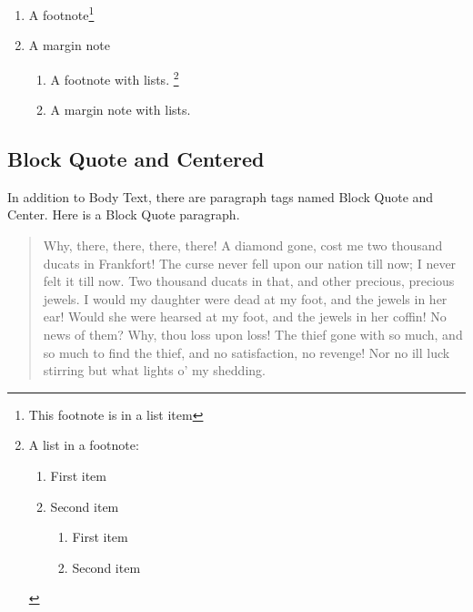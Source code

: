 \documentclass{article}
\begin{document}
\begin{enumerate}
\item A footnote\footnote{%
This footnote is in a list item}

\item A margin note%

\begin{enumerate}
\item A footnote with lists. \footnote{%
A list in a footnote:
\par
\begin{enumerate}
\item First item
\par
\item Second item
\par
\begin{enumerate}
\item First item
\par
\item Second item
\end{enumerate}
\end{enumerate}
}

\item A margin note with lists. 
\end{enumerate}
\end{enumerate}

\subsection{Block Quote and Centered}

In addition to Body Text, there are paragraph tags named Block Quote and
Center. Here is a Block Quote paragraph.

\begin{quotation}
Why, there, there, there, there! A diamond gone, cost me two thousand ducats
in Frankfort! The curse never fell upon our nation till now; I never felt it
till now. Two thousand ducats in that, and other precious, precious jewels.
I would my daughter were dead at my foot, and the jewels in her ear! Would
she were hearsed at my foot, and the jewels in her coffin! No news of them?
Why, thou loss upon loss! The thief gone with so much, and so much to find
the thief, and no satisfaction, no revenge! Nor no ill luck stirring but
what lights o' my shedding.
\end{quotation}
\end{document}
